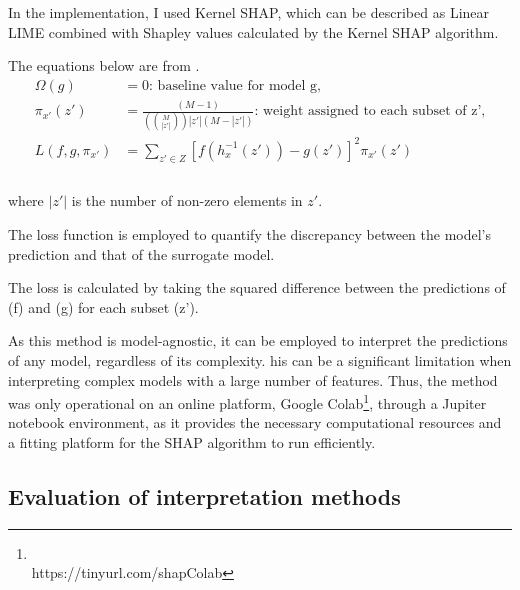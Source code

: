 In the implementation, I used Kernel SHAP, which can be described as Linear LIME combined with Shapley values calculated by the Kernel SHAP algorithm.

\begin{theorem}
\end{theorem}
\label{corr:shap_kernel}
The equations below are from \cite{lundberg2017unifiedapproachinterpretingmodel}.
\begin{equation}
\begin{split}
\Omega(g) &= 0 \text{: baseline value for model g,}\\
\pi_{x'}(z') &= \frac{(M-1)}{(\binom{M}{|z'|}) |z'| (M - |z'|)}\text{: weight assigned to each subset of z',} \\
L(f,g,\pi_{x'}) &= \sum_{z' \in Z} \left[ f(h_x^{-1}(z')) - g(z') \right]^2 \pi_{x'}(z') \\
\label{eq:kernel}
\end{split}
\end{equation}
\vspace{-0.4cm} \\where $|z'|$ is the number of non-zero elements in $z'$.

The loss function is employed to quantify the discrepancy between the model's prediction and that of the surrogate model.

The loss is calculated by taking the squared difference between the predictions of (f) and (g) for each subset (z').



As this method is model-agnostic, it can be employed to interpret the predictions of any model, regardless of its complexity.
his can be a significant limitation when interpreting complex models with a large number of features.
Thus, the method was only operational on an online platform, Google
Colab\footnote{\\https://tinyurl.com/shapColab}, through a Jupiter notebook environment, as it provides
the necessary computational resources and a fitting platform for the SHAP algorithm to run efficiently.


\subsection{Evaluation of interpretation methods}\label{subsec:evaluation-of-interpretation-methods}


